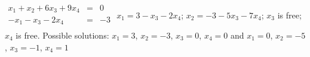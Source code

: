 {$\begin{array}{rcJ}
x_1+x_2+6x_3+9x_4&=&0\\
-x_1-x_3-2x_4&=&-3\\
\end{array}$}
{$x_1=3-x_3-2x_4$; $x_2=-3-5x_3-7x_4$; $x_3$ is free; $x_4$ is free. Possible solutions: $x_1 =3$, $x_2 = -3$, $x_3=0$, $x_4=0$ and $x_1 = 0$, $x_2 = -5$, $x_3 =-1$, $x_4=1$ }
